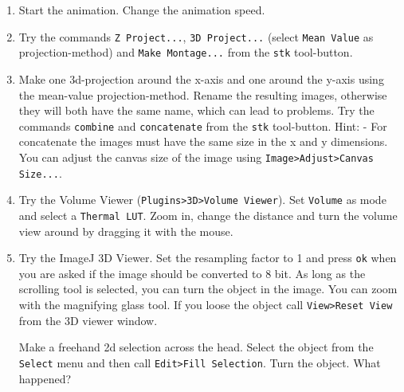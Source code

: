 \begin{enumerate}
\item Start the animation. Change the animation speed.
\item Try the commands \texttt{Z Project...}, \texttt{3D Project...} (select \texttt{Mean Value} as projection-method) and \texttt{Make Montage...} from the \texttt{stk} tool-button.
\item Make one 3d-projection around the x-axis and one around the y-axis using the mean-value
projection-method. Rename the resulting images, otherwise they will both have the same
name, which can lead to problems. Try the commands \texttt{combine} and \texttt{concatenate} from the \texttt{stk} tool-button. Hint: - For concatenate the images must have the same size in the x and y dimensions. You can adjust the canvas size of the image using \texttt{Image>Adjust>Canvas Size...}.
\item Try the Volume Viewer (\texttt{Plugins>3D>Volume Viewer}). Set \texttt{Volume} as mode and select a \texttt{Thermal LUT}. Zoom in, change the distance and turn the volume view around by dragging it with the mouse. 
\item Try the ImageJ 3D Viewer. Set the resampling factor to 1 and press \texttt{ok} when you are asked if the image should be converted to 8 bit. As long as the scrolling tool is selected, you can turn the object in the image. You can zoom with the magnifying glass tool. If you loose the
object call \texttt{View>Reset View} from the 3D viewer window.

Make a freehand 2d selection across the head. Select the object from the \texttt{Select} menu and
then call \texttt{Edit>Fill Selection}. Turn the object. What happened?

\fbox{
	\begin{minipage}{\linewidth}
		\hfill\vspace{2cm}
	\end{minipage}
	}
\end{enumerate}

